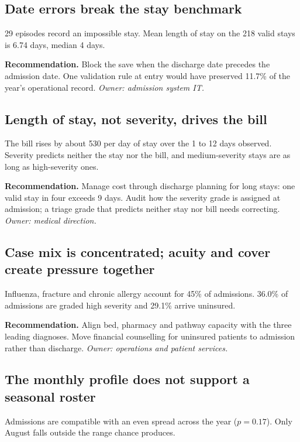 \documentclass[12pt,a4paper]{article}
\begin{document}
\subsection{Date errors break the stay benchmark}

29 episodes record an impossible stay. Mean length of stay on the 218 valid stays is
6.74 days, median 4 days.

\textbf{Recommendation.} Block the save when the discharge date precedes the
admission date. One validation rule at entry would have preserved 11.7\% of the
year's operational record. \emph{Owner: admission system IT.}

\subsection{Length of stay, not severity, drives the bill}

The bill rises by about 530 per day of stay over the 1 to 12 days observed. Severity
predicts neither the stay nor the bill, and medium-severity stays are as long as
high-severity ones.

\textbf{Recommendation.} Manage cost through discharge planning for long stays: one
valid stay in four exceeds 9 days. Audit how the severity grade is assigned at
admission; a triage grade that predicts neither stay nor bill needs correcting.
\emph{Owner: medical direction.}

\subsection{Case mix is concentrated; acuity and cover create pressure together}

Influenza, fracture and chronic allergy account for 45\% of admissions. 36.0\% of
admissions are graded high severity and 29.1\% arrive uninsured.

\textbf{Recommendation.} Align bed, pharmacy and pathway capacity with the three
leading diagnoses. Move financial counselling for uninsured patients to admission
rather than discharge. \emph{Owner: operations and patient services.}

\subsection{The monthly profile does not support a seasonal roster}

Admissions are compatible with an even spread across the year ($p = 0.17$). Only
August falls outside the range chance produces.
\end{document}

